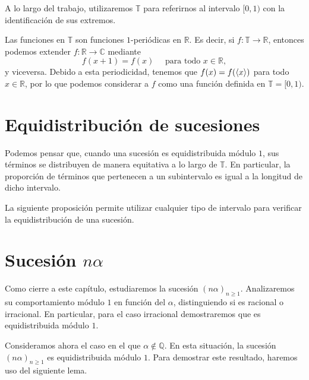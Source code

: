 A lo largo del trabajo, utilizaremos $\mathbb{T}$ para referirnos al intervalo $[0,1)$ 
con la identificación de sus extremos. 

\begin{remark}
    Las funciones en $\mathbb{T}$ son funciones $1$-periódicas en $\mathbb{R}$. Es decir, si $f:\mathbb{T}\to\mathbb{R}$, entonces podemos extender $f:\mathbb{R}\to\mathbb{C}$ mediante
    \[
        f(x+1) = f(x) \quad \text{ para todo } x \in \mathbb{R},
    \]
    y viceversa. Debido a esta periodicidad, tenemos que $f(x) = f(\langle x \rangle)$ para todo $x \in \mathbb{R}$,
    por lo que podemos considerar a $f$ como una función definida en $\mathbb{T}=[0,1)$.
\end{remark}

\section{Equidistribución de sucesiones}



Podemos pensar que, cuando una sucesión es equidistribuida módulo $1$, sus términos se distribuyen
de manera equitativa a lo largo de $\mathbb{T}$. En particular, la proporción de términos que 
pertenecen a un subintervalo es igual a la longitud de dicho intervalo.

La siguiente proposición permite utilizar cualquier tipo de intervalo para
verificar la equidistribución de una sucesión.









  



\section{Sucesión $n\alpha$}

Como cierre a este capítulo, estudiaremos la sucesión $(n\alpha)_{n\geq1}$. 
Analizaremos su comportamiento módulo $1$ en función del $\alpha$, distinguiendo si es
racional o irracional. En particular, para el caso irracional demostraremos que es 
equidistribuida módulo $1$.



Consideramos ahora el caso en el que $\alpha \notin \mathbb{Q}$. En esta situación, 
la sucesión $(n\alpha)_{n\geq1}$ es equidistribuida módulo $1$. Para demostrar
este resultado, haremos uso del siguiente lema.








